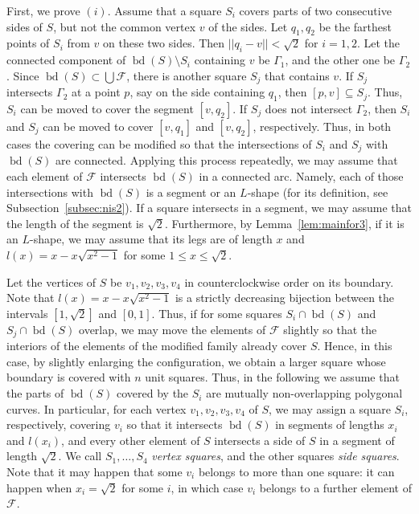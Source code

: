 \documentclass[twoside]{amsart}
\DeclareMathOperator{\bd}{bd}
\begin{document}
First, we prove $(i)$.
Assume that a square $S_i$ covers parts of two consecutive sides of $S$, but not the common vertex $v$ of the sides. Let $q_1,q_2$ be the farthest points of $S_i$ from $v$ on these two sides.  Then $||q_i - v || < \sqrt{2}$ for $i=1,2$. Let the connected component of $\bd(S) \setminus S_i$ containing $v$ be $\Gamma_1$, and the other one be $\Gamma_2$. Since $\bd(S) \subset \bigcup \mathcal{F}$, there is another square $S_j$ that contains $v$. If $S_j$ intersects $\Gamma_2$ at a point $p$, say on the side containing $q_1$, then $[p,v] \subseteq S_j$. Thus, $S_i$ can be moved to cover the segment $[v,q_2]$. If $S_j$ does not intersect $\Gamma_2$, then $S_i$ and $S_j$ can be moved to cover $[v,q_1]$ and $[v,q_2]$, respectively. Thus, in both cases the covering can be modified so that the intersections of $S_i$ and $S_j$ with $\bd(S)$ are connected. Applying this process repeatedly, we may assume that each element of $\mathcal{F}$ intersects $\bd(S)$ in a connected arc. Namely, each of those intersections with $\bd(S)$ is a segment or an $L$-shape (for its definition, see Subsection~\ref{subsec:nis2}). If a square intersects in a segment, we may assume that the length of the segment is $\sqrt{2}$. Furthermore, by Lemma~\ref{lem:mainfor3}, if it is an $L$-shape, we may assume that its legs are of length $x$ and
$l(x)=x-x\sqrt{x^2-1}$ for some $1 \leq x \leq \sqrt{2}$. 

Let the vertices of $S$ be
$v_1, v_2, v_3, v_4$ in counterclockwise order on its boundary.
Note that $l(x)=x -x \sqrt{x^2-1}$ is a strictly decreasing bijection between the intervals $[1,\sqrt{2}]$ and $[0,1]$. Thus, if for some squares $S_i \cap \bd(S)$ and $S_j \cap \bd(S)$ overlap, we may move the elements of $\mathcal{F}$ slightly so that the interiors of the elements of the modified family already cover $S$. Hence, in this case, by slightly enlarging the configuration, we obtain a larger square whose boundary is covered with $n$ unit squares. Thus, in the following we assume that the parts of $\bd(S)$ covered by the $S_i$ are mutually non-overlapping polygonal curves.
In particular, for each vertex $v_1, v_2, v_3, v_4$ of $S$, we may assign %
a square $S_i$, respectively, covering $v_i$ so that it intersects $\bd(S)$ in segments of lengths $x_i$ and $l(x_i)$, and every other element of $S$ intersects a side of $S$ in a segment of length $\sqrt{2}$. We call $S_1, \ldots, S_4$ \emph{vertex squares}, and the other squares \emph{side squares}. Note that it may happen that some $v_i$ belongs to more than one square: it can happen when $x_i=\sqrt{2}$ for some $i$, in which case $v_i$ belongs to a further element of $\mathcal{F}$.
\end{document}
